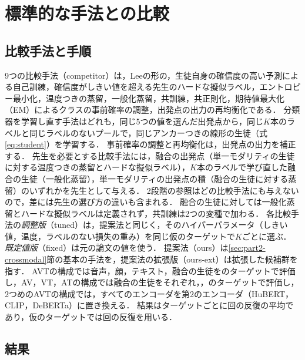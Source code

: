 \section{標準的な手法との比較}
\label{sec:comparison}

\subsection{比較手法と手順}
\label{sec:comparison-protocol}

9つの比較手法（competitor）は，Lee\cite{lee2013pseudolabel}の形の，生徒自身の確信度の高い予測による自己訓練，確信度がしきい値を超える先生のハードな擬似ラベル，エントロピー最小化\cite{grandvalet2004semisupervised}，温度つきの蒸留\cite{hinton2015distilling}，一般化蒸留\cite{lopezpaz2016unifying}，共訓練\cite{blum1998combining}，共正則化\cite{sindhwani2005coregularization}，期待値最大化（EM）によるクラスの事前確率の調整\cite{saerens2002adjusting}，出発点の出力の再均衡化である．
分類器を学習し直す手法はどれも，同じ5つの値を選んだ出発点から，同じ$K$本のラベルと同じラベルのないプールで，同じアンカーつきの線形の生徒（式\eqref{eq:student}）を学習する．
事前確率の調整と再均衡化は，出発点の出力を補正する．
先生を必要とする比較手法には，融合の出発点（単一モダリティの生徒に対する温度つきの蒸留とハードな擬似ラベル），$K$本のラベルで学び直した融合の生徒（一般化蒸留），単一モダリティの出発点の積（融合の生徒に対する蒸留）のいずれかを先生として与える．
2段階の参照はどの比較手法にも与えないので，差には先生の選び方の違いも含まれる．
融合の生徒に対しては一般化蒸留とハードな擬似ラベルは定義されず，共訓練は2つの変種で加わる．
各比較手法の\emph{調整版}（tuned）は，提案法と同じく，そのハイパーパラメータ（しきい値，温度，ラベルのない損失の重み）を同じ仮のターゲットで$K$ごとに選ぶ．
\emph{既定値版}（fixed）は元の論文の値を使う．
提案法（ours）は\ref{sec:part2-crossmodal}節の基本の手法を，提案法の拡張版（ours-ext）は拡張した候補群を指す．
AVTの構成では音声，顔，テキスト，融合の生徒をのターゲットで評価し，AV，VT，ATの構成では融合の生徒をそれぞれ，，のターゲットで評価し，2つめのAVTの構成では，すべてのエンコーダを第2のエンコーダ（HuBERT，CLIP，DeBERTa）に置き換える．
結果はターゲットごとに回の反復の平均であり，仮のターゲットでは回の反復を用いる．

\subsection{結果}
\label{sec:comparison-results}

